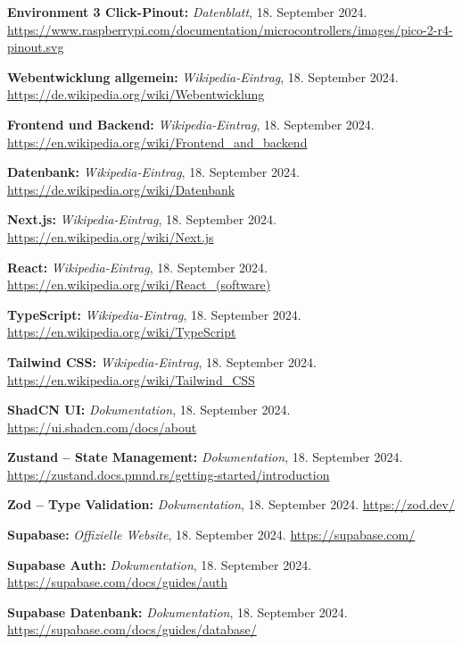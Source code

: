 \begin{thebibliography}{9999}
\textbf{Environment 3 Click-Pinout:} \textit{Datenblatt}, 18. September 2024.  
\url{https://www.raspberrypi.com/documentation/microcontrollers/images/pico-2-r4-pinout.svg}




\textbf{Webentwicklung allgemein:} \textit{Wikipedia-Eintrag}, 18. September 2024.  
\url{https://de.wikipedia.org/wiki/Webentwicklung}

\textbf{Frontend und Backend:} \textit{Wikipedia-Eintrag}, 18. September 2024.  
\url{https://en.wikipedia.org/wiki/Frontend_and_backend}

\textbf{Datenbank:} \textit{Wikipedia-Eintrag}, 18. September 2024.  
\url{https://de.wikipedia.org/wiki/Datenbank}

\textbf{Next.js:} \textit{Wikipedia-Eintrag}, 18. September 2024.  
\url{https://en.wikipedia.org/wiki/Next.js}

\textbf{React:} \textit{Wikipedia-Eintrag}, 18. September 2024.  
\url{https://en.wikipedia.org/wiki/React_(software)}

\textbf{TypeScript:} \textit{Wikipedia-Eintrag}, 18. September 2024.  
\url{https://en.wikipedia.org/wiki/TypeScript}

\textbf{Tailwind CSS:} \textit{Wikipedia-Eintrag}, 18. September 2024.  
\url{https://en.wikipedia.org/wiki/Tailwind_CSS}

\textbf{ShadCN UI:} \textit{Dokumentation}, 18. September 2024.  
\url{https://ui.shadcn.com/docs/about}

\textbf{Zustand – State Management:} \textit{Dokumentation}, 18. September 2024.  
\url{https://zustand.docs.pmnd.rs/getting-started/introduction}

\textbf{Zod – Type Validation:} \textit{Dokumentation}, 18. September 2024.  
\url{https://zod.dev/}

\textbf{Supabase:} \textit{Offizielle Website}, 18. September 2024.  
\url{https://supabase.com/}

\textbf{Supabase Auth:} \textit{Dokumentation}, 18. September 2024.  
\url{https://supabase.com/docs/guides/auth}

\textbf{Supabase Datenbank:} \textit{Dokumentation}, 18. September 2024.  
\url{https://supabase.com/docs/guides/database/}


\end{thebibliography}
